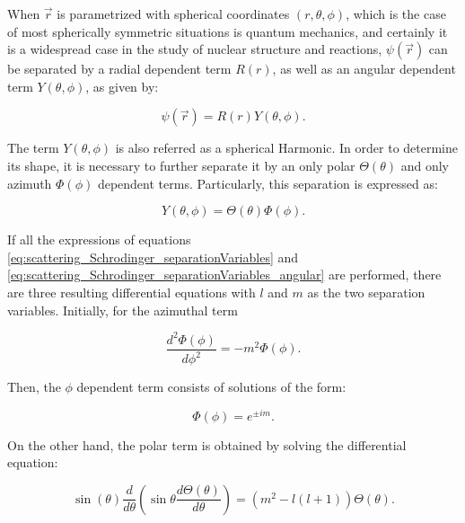 \documentclass[openany]{book}
\begin{document}
When $\vec r$ is parametrized with spherical coordinates $(r, \theta, \phi)$, which is the case of most spherically symmetric situations is quantum mechanics, and certainly it is a widespread case in the study of nuclear structure and reactions, $\psi(\vec r)$ can be separated by a radial dependent term  $R(r)$, as well as an angular dependent term $Y(\theta, \phi)$, as given by:

\begin{equation}\label{eq:scattering_Schrodinger_separationVariables}
	\psi(\vec r) = R(r) Y(\theta, \phi).
\end{equation}

The term $Y(\theta, \phi)$ is also referred as a spherical Harmonic. In order to determine its shape, it is necessary to further separate it by an only polar $\Theta(\theta)$ and only azimuth $\Phi(\phi)$ dependent terms. Particularly, this separation is expressed as:

\begin{equation}\label{eq:scattering_Schrodinger_separationVariables_angular}
	Y(\theta, \phi) = \Theta (\theta) \Phi (\phi).
\end{equation}

If all the expressions of equations \ref{eq:scattering_Schrodinger_separationVariables} and \ref{eq:scattering_Schrodinger_separationVariables_angular} are performed, there are three resulting differential equations with $l$ and $m$ as the two separation variables. Initially, for the azimuthal term

\begin{equation}\label{eq:scattering_Schrodinger_azimuthal}
	\frac{d^2\Phi(\phi)}{d\phi^2}  = -m^2 \Phi(\phi).
\end{equation}

Then, the $\phi$ dependent term consists of solutions of the form: 

\begin{equation}\label{eq:scattering_Schrodinger_azimuthal_solution}
	\Phi(\phi) = e^{\pm im}.
\end{equation}

On the other hand, the polar term is obtained by solving the differential equation: 

\begin{equation}\label{eq:scattering_Schrodinger_polar}
	\sin(\theta) \frac{d}{d\theta} \left( \sin \theta \frac{d\Theta(\theta)}{d\theta}\right) =  (m^2 - l(l+1) ) \Theta(\theta).
\end{equation}
\end{document}
